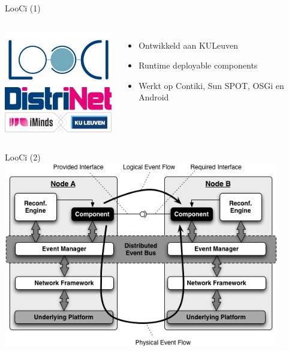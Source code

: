 \documentclass[presentation, bigger]{beamer}
\begin{document}
\begin{frame}[label=sec-2-3]{LooCi (1)}
  \begin{columns}[t]
    \centering
    \includegraphics[width=5cm,keepaspectration=true]{looci/looci.png}\\
    \includegraphics[width=5cm,keepaspectration=true]{looci/distrinet.png}
    \centering
    \begin{itemize}
    \item Ontwikkeld aan KULeuven
    \item Runtime deployable components
    \item Werkt op Contiki, Sun SPOT, OSGi en Android
    \end{itemize}
  \end{columns}
\end{frame}

\begin{frame}[label=sec-2-4]{LooCi (2)}
  \centering
  \includegraphics[width=0.9\textwidth,keepaspectration=true]{looci/LooCIExecEnvironment.png}
\end{frame}
\end{document}
